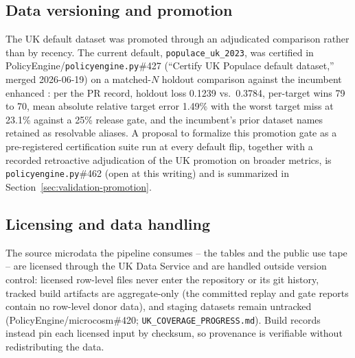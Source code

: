 \subsection{Data versioning and promotion}
\label{sec:data-versioning}


The UK default dataset was promoted through an adjudicated comparison
rather than by recency. The current default, \texttt{populace\_uk\_2023},
was certified in PolicyEngine/\texttt{policyengine.py}\#427 (``Certify UK
Populace default dataset,'' merged 2026-06-19) on a matched-$N$ holdout
comparison against the incumbent enhanced \frs{}: per the PR record,
holdout loss 0.1239 vs.\ 0.3784, per-target wins 79 to 70, mean absolute
relative target error 1.49\% with the worst target miss at 23.1\% against
a 25\% release gate, and the incumbent's prior dataset names retained as
resolvable aliases. A proposal to formalize this promotion gate as a
pre-registered certification suite run at every default flip, together
with a recorded retroactive adjudication of the UK promotion on broader
metrics, is \texttt{policyengine.py}\#462 (open at this writing) and is
summarized in Section~\ref{sec:validation-promotion}.

\subsection{Licensing and data handling}
\label{sec:data-licensing}

The source microdata the pipeline consumes -- the \frs{} tables and the
\spi{} public use tape -- are licensed through the UK Data Service and are
handled outside version control: licensed row-level files never enter the
\microcosm{} repository or its git history, tracked build artifacts are
aggregate-only (the committed replay and gate reports contain no row-level
donor data), and staging datasets remain untracked
(PolicyEngine/microcosm\#420; \texttt{UK\_COVERAGE\_PROGRESS.md}). Build
records instead pin each licensed input by checksum, so provenance is
verifiable without redistributing the data.
